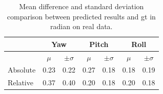 \begin{table}
  \caption{Mean difference and standard deviation comparison between predicted
    results and \gls{gt} in radian on real data.}
  \begin{tabular}{l cc cc cc}
    \toprule
    & \multicolumn{2}{c}{Yaw} & \multicolumn{2}{c}{Pitch} &
                                                            \multicolumn{2}{c}{Roll}\\
    \midrule
    & $\mu$ & $\pm \sigma$ &  $\mu$ & $\pm \sigma$ &  $\mu$ & $\pm \sigma$\\
    \cmidrule{2-3} \cmidrule{4-5} \cmidrule{6-7}

    Absolute & 0.23 & 0.22 & 0.27 & 0.18 & 0.18 & 0.19 \\
    Relative & 0.37 & 0.40 & 0.20 & 0.18 & 0.20 & 0.18\\
    \bottomrule
  \end{tabular}
  \label{tab:tab1}
\end{table}










